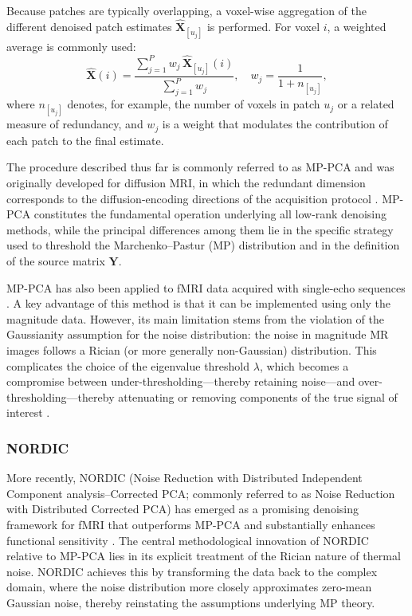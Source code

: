 Because patches are typically overlapping, a voxel-wise aggregation of the different denoised patch estimates $\hat{\mathbf{X}}_{[u_j]}$ is performed. For voxel $i$, a weighted average is commonly used:
\begin{equation}
    \hat{\mathbf{X}}(i) = \frac{\sum_{j=1}^P w_j \, \hat{\mathbf{X}}_{[u_j]}(i)}{\sum_{j=1}^P w_j}, \quad 
    w_j = \frac{1}{1 + n_{[u_j]}},
\end{equation}
where $n_{[u_j]}$ denotes, for example, the number of voxels in patch $u_j$ or a related measure of redundancy, and $w_j$ is a weight that modulates the contribution of each patch to the final estimate.

 The procedure described thus far is commonly referred to as MP-PCA and was originally developed for diffusion MRI, in which the redundant dimension corresponds to the diffusion-encoding directions of the acquisition protocol \citep{veraart2016denoising, veraartDiffusionMRINoise2016}. MP-PCA  constitutes the fundamental operation underlying all low-rank denoising methods, while the principal differences among them lie in the specific strategy used to threshold the Marchenko–Pastur (MP) distribution and in the definition of the source matrix $\mathbf{Y}$. 
 
 MP-PCA has also been applied to fMRI data acquired with single-echo sequences \citep{ades-aronImprovedTaskbasedFunctional2021,fernandesMPPCADenoisingFMRI2023a}. A key advantage of this method is that it can be implemented using only the magnitude data. However, its main limitation stems from the violation of the Gaussianity assumption for the noise distribution: the noise in magnitude MR images follows a Rician (or more generally non-Gaussian) distribution. This complicates the choice of the eigenvalue threshold $\lambda$, which becomes a compromise between under-thresholding—thereby retaining noise—and over-thresholding—thereby attenuating or removing components of the true signal of interest \citep{zhu2022denoise, manzanopatronDenoisingDiffusionMRI2024}.

\subsubsection{NORDIC}

More recently, NORDIC (Noise Reduction with Distributed Independent Component analysis–Corrected PCA; commonly referred to as Noise Reduction with Distributed Corrected PCA) has emerged as a promising denoising framework for fMRI that outperforms MP-PCA and substantially enhances functional sensitivity \citep{vizioli2021lowering, moeller2021noise, dowdle2023evaluating}. The central methodological innovation of NORDIC relative to MP-PCA lies in its explicit treatment of the Rician nature of thermal noise. NORDIC achieves this by transforming the data back to the complex domain, where the noise distribution more closely approximates zero-mean Gaussian noise, thereby reinstating the assumptions underlying MP theory.

